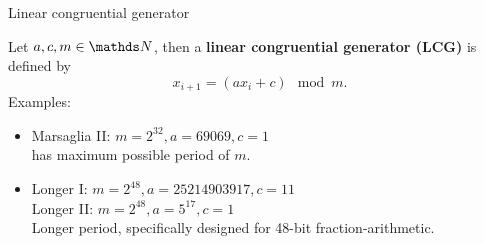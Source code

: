 









\begin{vbframe}{Linear congruential generator}

Let $a,c,m \in \N$, then a \textbf{linear congruential generator (LCG)} is defined by
$$
  x_{i+1} = (a x_i + c) \mod m.
$$
Examples:
\begin{itemize}
 \item Marsaglia II: $m = 2^{32}, a = 69069, c = 1$ \\
has maximum possible period of $m$.
\item Longer I: $m = 2^{48}, a = 25214903917, c = 11$ \\
Longer II: $m = 2^{48}, a = 5^{17}, c = 1$ \\
Longer period, specifically designed for 48-bit fraction-arithmetic.
\end{itemize}

%

\end{vbframe}



